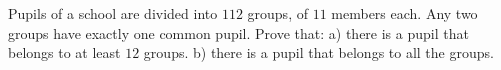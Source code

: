 Pupils of a school are divided into $112$ groups, of $11$ members each.
Any two groups have exactly one common pupil. Prove that:
a) there is a pupil that belongs to at least $12$ groups.
b) there is a pupil that belongs to all the groups.